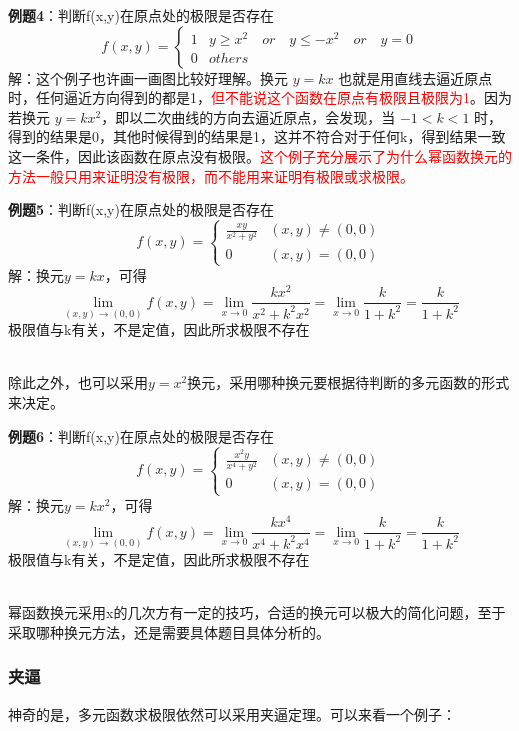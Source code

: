 \documentclass{article}
\begin{document}
\textbf{例题4}：判断f(x,y)在原点处的极限是否存在
\[f(x,y)= \begin{cases} 1  & y \geq x^2 \quad or \quad y \leq -x^2 \quad or \quad y = 0\\0 & others\end{cases}\]
\quad \quad 解：这个例子也许画一画图比较好理解。换元 $y=kx$ 也就是用直线去逼近原点时，任何逼近方向得到的都是1，\textcolor{red}{但不能说这个函数在原点有极限且极限为1}。因为若换元 $y=kx^2$，即以二次曲线的方向去逼近原点，会发现，当 $-1<k<1$ 时，得到的结果是0，其他时候得到的结果是1，这并不符合对于任何k，得到结果一致这一条件，因此该函数在原点没有极限。\textcolor{red}{这个例子充分展示了为什么幂函数换元的方法一般只用来证明没有极限，而不能用来证明有极限或求极限。}

\textbf{例题5}：判断f(x,y)在原点处的极限是否存在
\[f(x,y)= \begin{cases} \frac{xy}{ x^2+y^2 }  & (x,y) \neq (0,0)\\0 & (x,y) = (0,0)\end{cases}\]
\quad \quad 解：换元$y=kx$，可得
\[\lim\limits_{(x,y) \rightarrow (0,0)}f(x,y)=  
\lim\limits_{x \rightarrow 0}  \frac{kx^2}{x^2+k^2x^2}= 
\lim\limits_{x \rightarrow 0}  \frac{k}{1+k^2}  = \frac{k}{1+k^2}\]
极限值与k有关，不是定值，因此所求极限不存在

~\\

除此之外，也可以采用$y=x^2$换元，采用哪种换元要根据待判断的多元函数的形式来决定。

\textbf{例题6}：判断f(x,y)在原点处的极限是否存在
\[f(x,y)= \begin{cases} \frac{x^2y}{ x^4+y^2 }  & (x,y) \neq (0,0)\\0 & (x,y) = (0,0)\end{cases}\]
\quad \quad 解：换元$y=kx^2$，可得
\[\lim\limits_{(x,y) \rightarrow (0,0)}f(x,y)=  
\lim\limits_{x \rightarrow 0}  \frac{kx^4}{x^4+k^2x^4}= 
\lim\limits_{x \rightarrow 0}  \frac{k}{1+k^2}  = \frac{k}{1+k^2}\]
极限值与k有关，不是定值，因此所求极限不存在

~\\

幂函数换元采用x的几次方有一定的技巧，合适的换元可以极大的简化问题，至于采取哪种换元方法，还是需要具体题目具体分析的。


\subsubsection{夹逼}
神奇的是，多元函数求极限依然可以采用夹逼定理。可以来看一个例子：
\end{document}
